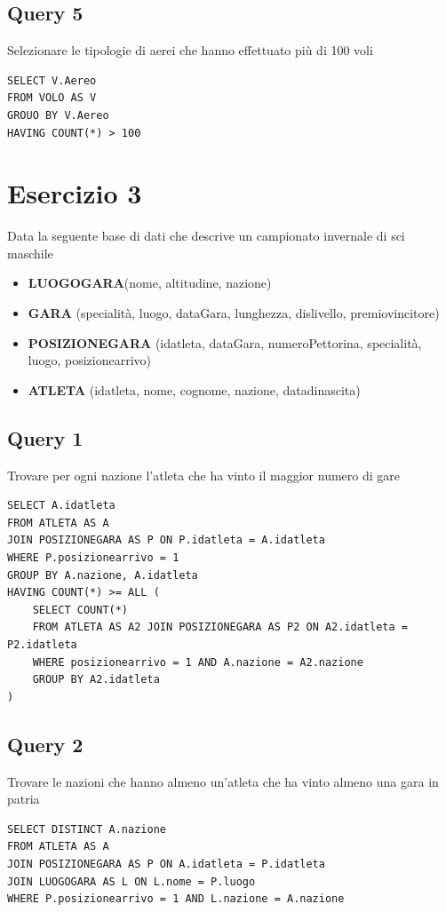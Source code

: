 \subsection{Query 5}
Selezionare le tipologie di aerei che hanno effettuato più di 100 voli

\begin{lstlisting}
SELECT V.Aereo
FROM VOLO AS V
GROUO BY V.Aereo
HAVING COUNT(*) > 100
\end{lstlisting}

\newpage
\section{Esercizio 3}
Data la seguente base di dati che descrive un campionato invernale di sci maschile

\begin{itemize}
    \item \textbf{LUOGOGARA}(nome, altitudine, nazione) 
    \item \textbf{GARA} (specialità, luogo, dataGara, lunghezza, dislivello, premiovincitore) 
    \item \textbf{POSIZIONEGARA} (idatleta, dataGara, numeroPettorina, specialità, luogo, posizionearrivo) 
    \item \textbf{ATLETA} (idatleta, nome, cognome, nazione, datadinascita)
\end{itemize}

\subsection{Query 1}
Trovare per ogni nazione l'atleta che ha vinto il maggior numero di gare

\begin{lstlisting}
SELECT A.idatleta
FROM ATLETA AS A
JOIN POSIZIONEGARA AS P ON P.idatleta = A.idatleta
WHERE P.posizionearrivo = 1
GROUP BY A.nazione, A.idatleta
HAVING COUNT(*) >= ALL (
    SELECT COUNT(*)
    FROM ATLETA AS A2 JOIN POSIZIONEGARA AS P2 ON A2.idatleta = P2.idatleta
    WHERE posizionearrivo = 1 AND A.nazione = A2.nazione
    GROUP BY A2.idatleta
)
\end{lstlisting}

\subsection{Query 2}
Trovare le nazioni che hanno almeno un'atleta che ha vinto almeno una gara in patria

\begin{lstlisting}
SELECT DISTINCT A.nazione
FROM ATLETA AS A
JOIN POSIZIONEGARA AS P ON A.idatleta = P.idatleta
JOIN LUOGOGARA AS L ON L.nome = P.luogo
WHERE P.posizionearrivo = 1 AND L.nazione = A.nazione
\end{lstlisting}

